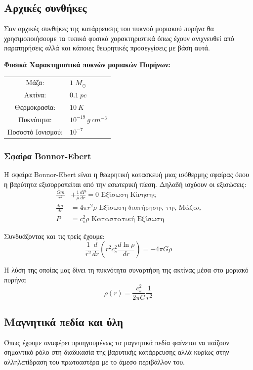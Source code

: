 \documentclass[a4paper,12pt]{memoir}
\newcommand{\sm}{$M_{\odot}$}
\begin{document}
\subsection{Αρχικές συνθήκες}
Σαν αρχικές συνθήκες της κατάρρευσης του πυκνού μοριακού πυρήνα θα χρησιμοποιήσουμε τα τυπικά φυσικά χαρακτηριστικά όπως έχουν ανιχνευθεί από παρατηρήσεις αλλά και κάποιες θεωρητικές προσεγγίσεις με βάση αυτά.

\textbf{Φυσικά Χαρακτηριστικά πυκνών μοριακών Πυρήνων:}

\begin{tabular}{|c l}
	Μάζα: & $1$ \sm \\
	Ακτίνα: & $0.1 \ pc$ \\
	Θερμοκρασία: & $10 \ K$ \\
	Πυκνότητα: & $10^{-19} \ g \, cm^{-3}$ \\
	Ποσοστό Ιονισμού: & $10^{-7}$ 
\end{tabular}

\subsubsection{Σφαίρα Bonnor-Ebert}
Η σφαίρα Bonnor-Ebert είναι η θεωρητική κατασκευή μιας ισόθερμης σφαίρας όπου η βαρύτητα εξισορροπείται από την εσωτερική πίεση. Δηλαδή ισχύουν οι εξισώσεις:
\begin{align}
\frac{Gm}{r^2} &+\frac{1}{\rho}\frac{dP}{dr}=0 \text{ Εξίσωση Κίνησης}\\
\frac{dm}{dr} &= 4 \pi r^2 \rho \text{ Εξίσωση διατήρησης της Μάζας}\\
P &= c_s ^2 \rho \text{ Καταστατική Εξίσωση}
\end{align}

Συνδυάζοντας και τις τρείς έχουμε:
\begin{equation}
\frac{1}{r^2}\frac{d}{dr} \left( r^2 c_s ^2 \frac{d \ln \rho}{dr}\right)  = -4 \pi G \rho
\end{equation}

Η λύση της οποίας μας δίνει τη πυκνότητα συναρτήση της ακτίνας μέσα στο μοριακό πυρήνα:
\begin{equation}
\label{eq:B-E_density}
\rho (r) =\frac{c_s ^2}{2 \pi G} \frac{1}{r^2}
\end{equation}

\subsection{Μαγνητικά πεδία και ύλη}
\label{par:frozenmagneticfield}
Όπως έχουμε αναφέρει προηγουμένως τα μαγνητικά πεδία φαίνεται να παίζουν σημαντικό ρόλο στη διαδικασία της βαρυτικής κατάρρευσης αλλά κυρίως στην αλληλεπίδραση του πρωτοαστέρα με το άμεσο περιβάλλον του.
\end{document}
